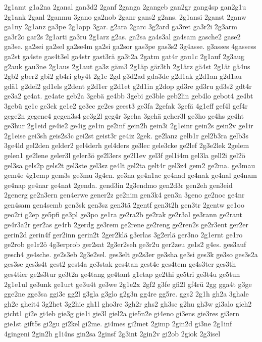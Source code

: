 {2g1amt
g1a2na
2ganal
gan3d2
2ganf
2ganga
2gangeb
gan2gr
gang4sp
gan2g1u
2g1ank
2ganl
2ganmu
3gano
ga2nob
2ganr
gans2
g2ans.
2g1ansi
2ganst
2ganw
ga1ny
2g1anz
ga3pe
2g1app
3gar.
g2ara
2garc
3g2ard
ga3ret
ga3r2i
2g3arm
ga3r2o
gar2s
2g1arti
ga3ru
2g1arz
g2as.
ga2sa
ga4s3al
ga4sam
gasche2
gase2
ga3se.
ga2sei
ga2sel
ga2se4m
ga2si
ga2sor
gas3pe
gas3s2
3g4asse.
g3asses
4gassess
ga2st
ga4ste
gas4t3el
ga4str
gast3rä
ga3t2a
2gatm
gat4r
gau1c
2g1auf
2g3aug
g2auk
gau3ne
2g1aus
2g1aut
ga3z
gäm3
2g1äp
gär3th
2g1ärz
gä4st
2g1ät
gä4us
2gb2
gber2
gbi2
gb4ri
gby4t
2g1c
2gd
g3d2ad
gda3de
g2d1ak
g2d1an
g2d1au
gdä1
g2dei2
gd1els
g2dent
g2d1er
g2d1et
g2d1in
g2dop
gd3re
gd3ru
gd3s2
gdt4r
ge3a2
ge4at.
ge4ate
geb2a
3gebä
ge4bb
3gebi
ge3ble
geb2lin
geb4lo
gebot4
ge4bt
3gebü
ge1c
ge3ck
ge1e2
ge3ec
ge2es
geest3
ge3fa
2gefak
3gefä
4g1eff
gef4l
gef4r
gege2n
gegene4
gegen3s4
ge3g2l
geg4r
3geha
3gehä
geher3l
ge3ho
ge4hs
ge4ht
ge3hur
2g1eid
ge4ie2
ge4ig
ge1in
ge2inf
gein2h
gein3i
2g1einr
gein2s
gein2v
ge1ir
2g1eise
gei3sh
geis2s3c
gei2st
geist3r
ge4iz
2gek.
ge2lanz
gelb1r
gel2b3ra
gelb3s
3ge4ld
gel2den
gelder2
gel4derh
gel4ders
ge3lec
gele3cke
ge2lef
2g3e2lek
2gelem
gelen1
ge2lene
geler3l
geler3ö
ge2l3ers
ge2l1ev
gel3f
gel1i4m
gel3la
gell2i
gel2ö
gel3sa
gels2p
gels2t
gel3ste
gel3sz
ge4lt
gel2ta
gelt4r
gel3z4
gem2
ge2ma.
ge3mau
gem4e
4g1emp
gem3s
ge3mu
3g4en.
ge3na
ge4n1ac
ge4nad
ge4nak
ge4nal
ge4nam
ge4nap
ge4nar
ge4nat
2genda.
gend3in
2g3endmo
gen2d3r
gen2eh
gen3eid
2generg
ge2n3ern
gen4erwe
gener2z
ge2nim
gen3k4
gen3n
3geno
ge2noc
ge4nr
gen4sam
gen4semb
gen3sk
gen3sz
gen3tä
2gentf
gen3t2h
gen3tr
2gentw
ge1oo
geo2ri
g2ep
ge5pfi
ge3pl
ge3po
ge1ra
ge2ra2b
ge2rak
ge2r3al
ge3rann
ge2rant
ge4r3a2r
ger2as
ge4rb
2gerdg
ge3rem
ge2rene
ge2reng
ge2ren2s
ge2r3ent
ger2er
gerin2d
gerin4f
ger2inn
gerin2t
2ger2klä
g3erlas
3g2erlä
ger3no
2g1ernt
ge1ro
ge2rob
ge1r2ö
4g3erprob
ger2sat
2g3er2seh
ge3r2u
ger2zeu
ge1s2
g4es.
ges3auf
gesch4
ge4sche.
ge2s3eb
2g3e2sel.
ges3elt
ge2s3er
ge3sha
ge3si
ges3k
ge3so
ges3s2a
ges3se
ges3s4t
gest2
gest4a
ge3stak
ges4tan
gest4e
ges4tem
ge4s3ter
ges3th
ges4tier
ge2s3tur
ge3t2a
ge4tang
ge4tant
g1etap
ge2thi
ge5tri
ge3t4u
ge5tun
2g1e1ul
ge3unk
ge1urt
ge3u4t
ge3we
2g1e2x
2gf2
g3fe
gfi2l
gf4rü
2gg
gga4t
g3ge
gge2ne
gge3sa
ggi3e
gg2l
g3gla
g3glo
g2g3n
gg4re
gg5re.
ggs2
2g1h
gh2a
3ghale
gh2e
gheit4
3g2het
3g2hie
gh1l
gho3re
3gh2r
ghs2
gh3sc
g2hu
gh3w
gi3alo
gich2
gicht1
gi2e
gi4eb
gie3g
gie1i
gie3l
giel2a
gie5n2e
gi4eno
gi3ens
gie3res
gi3ern
gie1st
gift5s
gi2gu
gi2kel
gi2me.
gi4mes
gi2met
2gimp
2gin2d
gi3ne
2g1inf
4gingeni
2gin2h
g1i4ns
gin2sa
2ginsf
2g3int
2gin2v
gi2ob
2giok
2g3isel
}
